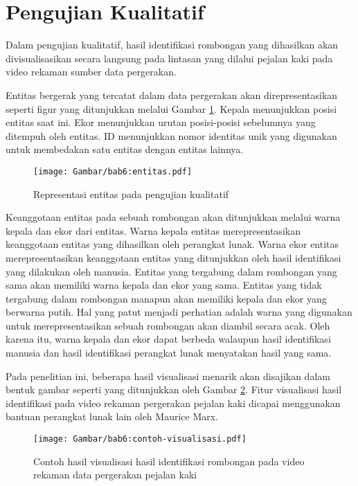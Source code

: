 \section{Pengujian Kualitatif}
\label{sec:qualitative}

Dalam pengujian kualitatif, hasil identifikasi rombongan yang dihasilkan akan divisualisasikan secara langsung pada lintasan yang dilalui pejalan kaki pada video rekaman sumber data pergerakan.

Entitas bergerak yang tercatat dalam data pergerakan akan direpresentasikan seperti figur yang ditunjukkan melalui Gambar \ref{bab6:representasi-entitas}. Kepala menunjukkan posisi entitas saat ini. Ekor menunjukkan urutan posisi-posisi sebelumnya yang ditempuh oleh entitas. ID menunjukkan nomor identitas unik yang digunakan untuk membedakan satu entitas dengan entitas lainnya.

\begin{figure}[t]
    \centering
    \texttt{[image: Gambar/bab6:entitas.pdf]}
    \caption{Representasi entitas pada pengujian kualitatif}
    \label{bab6:representasi-entitas}
\end{figure}

Keanggotaan entitas pada sebuah rombongan akan ditunjukkan melalui warna kepala dan ekor dari entitas. Warna kepala entitas merepresentasikan keanggotaan entitas yang dihasilkan oleh perangkat lunak. Warna ekor entitas merepresentasikan keanggotaan entitas yang ditunjukkan oleh hasil identifikasi yang dilakukan oleh manusia. Entitas yang tergabung dalam rombongan yang sama akan memiliki warna kepala dan ekor yang sama. Entitas yang tidak tergabung dalam rombongan manapun akan memiliki kepala dan ekor yang berwarna putih. Hal yang patut menjadi perhatian adalah warna yang digunakan untuk merepresentasikan sebuah rombongan akan diambil secara acak. Oleh karena itu, warna kepala dan ekor dapat berbeda walaupun hasil identifikasi manusia dan hasil identifikasi perangkat lunak menyatakan hasil yang sama.

Pada penelitian ini, beberapa hasil visualisasi menarik akan disajikan dalam bentuk gambar seperti yang ditunjukkan oleh Gambar \ref{bab6:contoh-visualisasi}. Fitur visualisasi hasil identifikasi pada video rekaman pergerakan pejalan kaki dicapai menggunakan bantuan perangkat lunak lain oleh Maurice Marx.

\begin{figure}[h]
    \centering
    \texttt{[image: Gambar/bab6:contoh-visualisasi.pdf]}
    \caption[Contoh hasil visualisasi rombongan]{Contoh hasil visualisasi hasil identifikasi rombongan pada video rekaman data pergerakan pejalan kaki}
    \label{bab6:contoh-visualisasi}
\end{figure}

